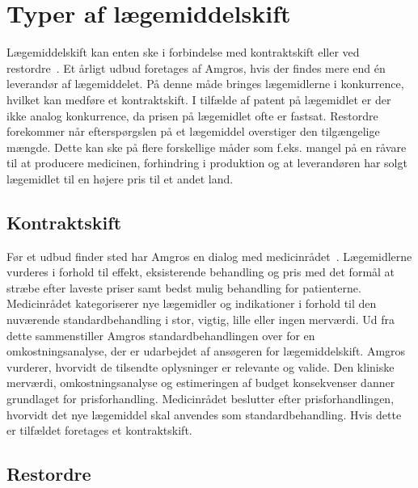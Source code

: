\section{Typer af lægemiddelskift}
Lægemiddelskift kan enten ske i forbindelse med kontraktskift eller ved restordre~\citep{Amgros2015}. Et årligt udbud foretages af Amgros, hvis der findes mere end én leverandør af lægemiddelet. På denne måde bringes lægemidlerne i konkurrence, hvilket kan medføre et kontraktskift. I tilfælde af patent på lægemidlet er der ikke analog konkurrence, da prisen på lægemidlet ofte er fastsat. Restordre forekommer når efterspørgslen på et lægemiddel overstiger den tilgængelige mængde. Dette kan ske på flere forskellige måder som f.eks. mangel på en råvare til at producere medicinen, forhindring i produktion og at leverandøren har solgt lægemidlet til en højere pris til et andet land.~\citep{Amgros2015}

\subsection{Kontraktskift}
Før et udbud finder sted har Amgros en dialog med medicinrådet~\citep{Amgros2017, Amgros2017a}. Lægemidlerne vurderes i forhold til effekt, eksisterende behandling og pris med det formål at stræbe efter laveste priser samt bedst mulig behandling for patienterne. Medicinrådet kategoriserer nye lægemidler og indikationer i forhold til den nuværende standardbehandling i stor, vigtig, lille eller ingen merværdi. Ud fra dette sammenstiller Amgros standardbehandlingen over for en omkostningsanalyse, der er udarbejdet af ansøgeren for lægemiddelskift. Amgros vurderer, hvorvidt de tilsendte oplysninger er relevante og valide. Den kliniske merværdi, omkostningsanalyse og estimeringen af budget konsekvenser danner grundlaget for prisforhandling. Medicinrådet beslutter efter prisforhandlingen, hvorvidt det nye lægemiddel skal anvendes som standardbehandling. Hvis dette er tilfældet foretages et kontraktskift.~\citep{Amgros2017, Amgros2017a}

\subsection{Restordre}

